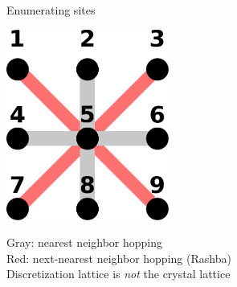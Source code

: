 \documentclass{beamer}
\begin{document}
\begin{frame}{Enumerating sites}
    \begin{multicols}{2}
        \includegraphics[width=0.4\textwidth]{hopping.pdf}
        \bf

        Gray: nearest neighbor hopping\\[1.5em]

        Red: next-nearest neighbor hopping (Rashba)\\[1.5em]

        Discretization lattice is \emph{not} the crystal lattice
    \end{multicols}
\end{frame}
\end{document}
